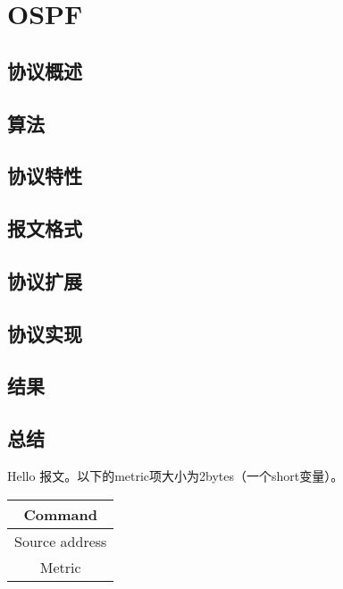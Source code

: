 \section{OSPF} %
\label{sec:ospf}
	\subsection{协议概述} %
	\label{sub:协议概述}
	
	\subsection{算法} %
	\label{sub:算法}
	
	\subsection{协议特性} %
	\label{sub:协议特性}
	
	\subsection{报文格式} %
	\label{sub:报文格式}
	
	\subsection{协议扩展} %
	\label{sub:协议扩展}
	
	\subsection{协议实现} %
	\label{sub:协议实现}
	
	\subsection{结果} %
	\label{sub:结果}
	
	\subsection{总结} %
	\label{sub:总结}
	
	Hello 报文。以下的metric项大小为2bytes（一个short变量）。
	\begin{table}[H]
	\centering
		\begin{tabular}{|c|}
			\hline
			Command \\
			\hline
			Source address \\
			\hline
			Metric \\
			\hline
		\end{tabular}		
	\end{table}
	

